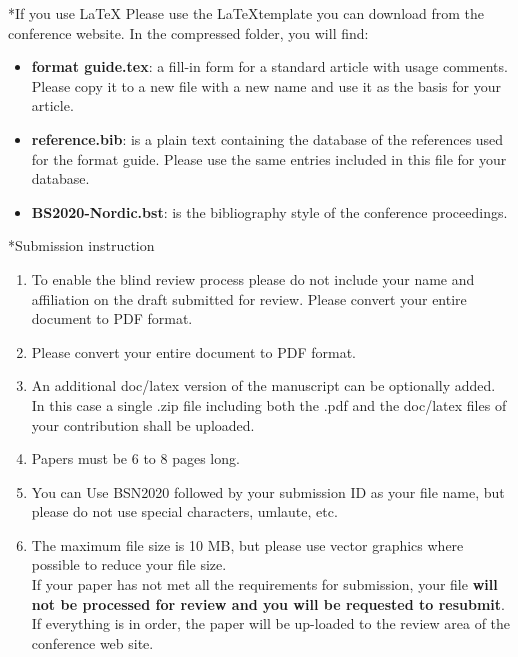 \documentclass[twocolumn, a4paper,10pt]{article}
\makeatletter
\renewcommand\section{\@startsection{section}{1}{\z@}{3pt}{3pt}{\normalfont\large\bfseries}}
\makeatother
\begin{document}
\section*{If you use \LaTeX}
Please use the \LaTeX template you can download from the conference website. In the compressed folder, you will find:
\begin{itemize}
\item \textbf{format guide.tex}: a fill-in form for a standard article with usage comments. Please copy it to a new file with a new name and use it as the basis for your article.
\item \textbf{reference.bib}: is a plain text containing the database of the references used for the format guide. Please use the same entries included in this file for your database.
\item \textbf{BS2020-Nordic.bst}: is the bibliography style of the conference proceedings. 
\end{itemize}
\section*{Submission instruction}
\begin{enumerate}
    \item To enable the blind review process please do not include your name and affiliation on the draft submitted for review. Please convert your entire document to PDF format. 
    \item Please convert your entire document to PDF format.
    \item An additional doc/latex version of the manuscript can be optionally added. In this case a single .zip file including both the .pdf and the doc/latex files of your contribution shall be uploaded.
    \item Papers must be 6 to 8 pages long.
    \item You can Use BSN2020 followed by your submission ID as your file name, but please do not use special characters, umlaute, etc.
    \item The maximum file size is 10 MB, but please use vector graphics where possible to reduce your file size.\\
	If your paper has not met all the requirements for submission, your file \textbf{will not be processed for review and you will be requested to resubmit}. If everything is in order, the paper will be up-loaded to the review area of the conference web site.
\end{enumerate}
\end{document}
